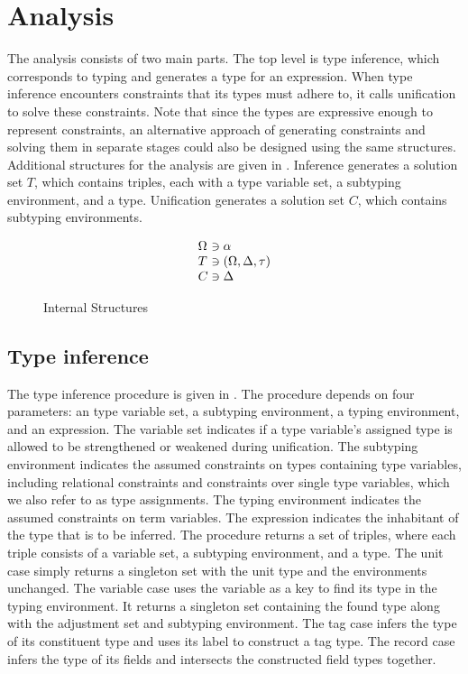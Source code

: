\documentclass[acmsmall]{acmart}
\begin{document}
\section{Analysis}

The analysis consists of two main parts. The top level is type inference, which corresponds to typing
and generates a type for an expression. When type inference encounters constraints that its types must adhere to,
it calls unification to solve these constraints. Note that since the types are expressive enough to represent constraints,
an alternative approach of generating constraints and solving them in separate stages could also be designed 
using the same structures. Additional structures for the analysis are given in . 
Inference generates a solution set $T$, which contains triples, each with a type variable set, a subtyping environment, and a type.  
Unification generates a solution set $C$, which contains subtyping environments. 


\begin{figure*}[h]
\[
\begin{array}{l @{} l}
  \Omega 
  &{} \owns \alpha 
  \\
  T 
  &{} \owns (\Omega, \Delta, \tau)
  \\
  C 
  &{} \owns \Delta
  \\
\end{array}
\]

\caption{Internal Structures}
\label{fig:internal}
\end{figure*}

\subsection{Type inference}
The type inference procedure is given in .
The procedure depends on four parameters: an type variable set, a subtyping environment, 
a typing environment, and an expression.
The variable set indicates if a type variable's assigned type is allowed to be strengthened or weakened  
during unification.
The subtyping environment indicates the assumed constraints on types containing type variables,
including relational constraints and constraints over single type variables, 
which we also refer to as type assignments.
The typing environment indicates the assumed constraints on term variables.
The expression indicates the inhabitant of the type that is to be inferred.
The procedure returns a set of triples, where each triple consists of a variable set, a subtyping environment,
and a type.
The unit case simply returns a singleton set with the unit type and the environments unchanged. 
The variable case uses the variable as a key to find its type in the typing environment. 
It returns a singleton set containing the found type along with the adjustment set and subtyping environment.
The tag case infers the type of its constituent type and uses its label to construct a tag type.
The record case infers the type of its fields and intersects the constructed field types together.
\end{document}
